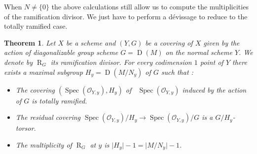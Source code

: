 \documentclass{amsart}
\newtheorem{theo}{Theorem}[section]
\theoremstyle{definition}
\theoremstyle{remark}
\begin{document}
When $N \neq \{0\}$ the above calculations still allow us to compute the multiplicities of the ramification divisor. We just have to perform a d\'evissage to reduce to the totally ramified case. 

\begin{theo}

Let $X$ be a scheme and $(Y,G)$ be a covering of $X$ given by the action of diagonalizable group scheme $G=\operatorname{D}(M)$ on the normal scheme $Y$. We denote by $\operatorname{R}_G$ its ramification divisor. For every codimension $1$ point of $Y$ there exists a maximal subgroup $H_y = \operatorname{D}(M/N_y)$ of $G$ such that : 

\begin{itemize}

\item[(i)] The covering $(\operatorname{Spec}({{\mathcal O}}_{Y,y}), H_y)$ of \ $\operatorname{Spec}({{\mathcal O}}_{Y,y})$ induced by the action of $G$ is totally ramified. 
\item[(ii)] The residual covering $\operatorname{Spec}({{\mathcal O}}_{Y,y})/H_y {\longrightarrow} \operatorname{Spec}({{\mathcal O}}_{Y,y})/G$ is a $G/H_y$-torsor. 
\item[(iii)] The multiplicity of $\operatorname{R}_G$ at $y$ is $\vert H_y \vert -1 = \vert M/N_y\vert -1$. 

\label{hy}

\end{itemize}

\end{theo}
\end{document}
